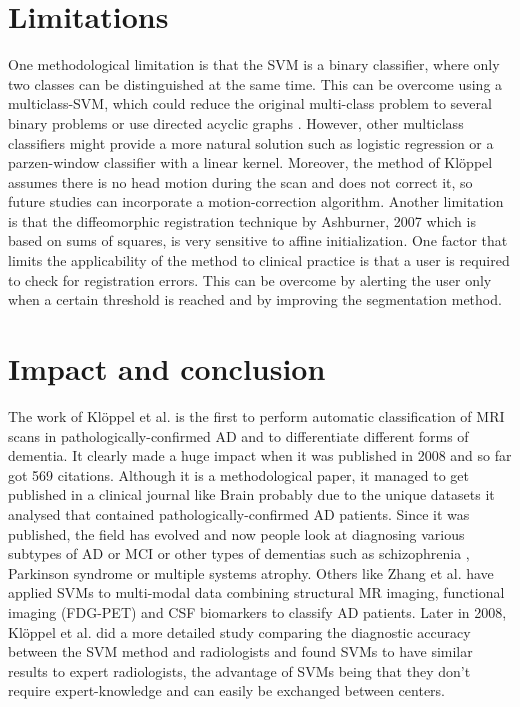 \documentclass[11pt,a4paper,oneside]{report}
\begin{document}
\section*{Limitations}

One methodological limitation is that the SVM is a binary classifier, where only two classes can be distinguished at the same time. This can be overcome using a multiclass-SVM, which could reduce the original multi-class problem to several binary problems \cite{duan2005best} or use directed acyclic graphs \cite{platt1999large}. However, other multiclass classifiers might provide a more natural solution such as logistic regression \cite{desikan2009automated} or a parzen-window classifier with a linear kernel. \cite{shawe2004kernel} Moreover, the method of Kl\"{o}ppel \cite{kloppel2008automatic} assumes there is no head motion during the scan and does not correct it, so future studies can incorporate a motion-correction algorithm. Another limitation is that the diffeomorphic registration technique by Ashburner, 2007 \cite{ashburner2007fast} which is based on sums of squares, is very sensitive to affine initialization. \cite{avants2011reproducible} One factor that limits the applicability of the method to clinical practice is that a user is required to check for registration errors. This can be overcome by alerting the user only when a certain threshold is reached and by improving the segmentation method.

\section*{Impact and conclusion}

The work of Kl\"{o}ppel et al. \cite{kloppel2008automatic} is the first to perform automatic classification of MRI scans in pathologically-confirmed AD and to differentiate different forms of dementia. It clearly made a huge impact when it was published in 2008 and so far got 569 citations. Although it is a methodological paper, it managed to get published in a clinical journal like Brain probably due to the unique datasets it analysed that contained pathologically-confirmed AD patients. Since it was published, the field has evolved and now people look at diagnosing various subtypes of AD or MCI \cite{haller2013individual} or other types of dementias such as schizophrenia \cite{ardekani2011diffusion}, Parkinson syndrome \cite{focke2011individual} or multiple systems atrophy. \cite{focke2011individual} Others like Zhang et al. \cite{zhang2011multimodal} have applied SVMs to multi-modal data combining structural MR imaging, functional imaging (FDG-PET) and CSF biomarkers to classify AD patients. Later in 2008, Kl\"{o}ppel et al. \cite{kloppel2008accuracy} did a more detailed study comparing the diagnostic accuracy between the SVM method and radiologists and found SVMs to have similar results to expert radiologists, the advantage of SVMs being that they don't require expert-knowledge and can easily be exchanged between centers.
\end{document}
